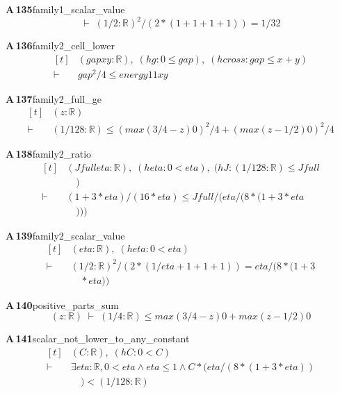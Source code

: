 \documentclass[conference]{IEEEtran}
\theoremstyle{definition}
\newcommand{\lean}[1]{\textsf{\footnotesize #1}}
\begin{document}
\noindent\textbf{A\,135}\quad\lean{family1\_scalar\_value}
{\footnotesize\[ \vdash\; (1/2 : \mathbb{R} ) ^{2} / (2 * (1 + 1 + 1 + 1)) = 1 / 32 \]}

\noindent\textbf{A\,136}\quad\lean{family2\_cell\_lower}
{\footnotesize\[ \begin{aligned}[t]
&(\mathit{gap} \mathit{x} \mathit{y} : \mathbb{R} ),\; (\mathit{hg} : 0 \leq \mathit{gap}),\; (\mathit{hcross} : \mathit{gap} \leq \mathit{x} + \mathit{y})\\
\vdash\;&\mathit{gap} ^{2} / 4 \leq \mathit{energy} 1 1 \mathit{x} \mathit{y}
\end{aligned} \]}

\noindent\textbf{A\,137}\quad\lean{family2\_full\_ge}
{\footnotesize\[ \begin{aligned}[t]
&(\mathit{z} : \mathbb{R} )\\
\vdash\;&(1/128 : \mathbb{R} ) \leq (\mathit{max} (3/4 - \mathit{z}) 0) ^{2} / 4 + (\mathit{max} (\mathit{z} - 1/2) 0) ^{2} / 4
\end{aligned} \]}

\noindent\textbf{A\,138}\quad\lean{family2\_ratio}
{\footnotesize\[ \begin{aligned}[t]
&(\mathit{Jfull} \mathit{eta} : \mathbb{R} ),\; (\mathit{heta} : 0 < \mathit{eta}),\; (\mathit{hJ} : (1/128 : \mathbb{R} ) \leq \mathit{Jfull}\\
&\quad )\\
\vdash\;&(1 + 3 * \mathit{eta}) / (16 * \mathit{eta}) \leq \mathit{Jfull} / (\mathit{eta} / (8 * (1 + 3 * \mathit{eta}\\
&\quad )))
\end{aligned} \]}

\noindent\textbf{A\,139}\quad\lean{family2\_scalar\_value}
{\footnotesize\[ \begin{aligned}[t]
&(\mathit{eta} : \mathbb{R} ),\; (\mathit{heta} : 0 < \mathit{eta})\\
\vdash\;&(1/2 : \mathbb{R} ) ^{2} / (2 * (1/\mathit{eta} + 1 + 1 + 1)) = \mathit{eta} / (8 * (1 + 3\\
&\quad * \mathit{eta}))
\end{aligned} \]}

\noindent\textbf{A\,140}\quad\lean{positive\_parts\_sum}
{\footnotesize\[ (\mathit{z} : \mathbb{R} ) \;\vdash\; (1/4 : \mathbb{R} ) \leq \mathit{max} (3/4 - \mathit{z}) 0 + \mathit{max} (\mathit{z} - 1/2) 0 \]}

\noindent\textbf{A\,141}\quad\lean{scalar\_not\_lower\_to\_any\_constant}
{\footnotesize\[ \begin{aligned}[t]
&(\mathit{C} : \mathbb{R} ),\; (\mathit{hC} : 0 < \mathit{C})\\
\vdash\;&\exists \mathit{eta} : \mathbb{R} , 0 < \mathit{eta} \wedge \mathit{eta} \leq 1 \wedge \mathit{C} * (\mathit{eta} / (8 * (1 + 3 * \mathit{eta}))\\
&\quad ) < (1 / 128 : \mathbb{R} )
\end{aligned} \]}
\end{document}
